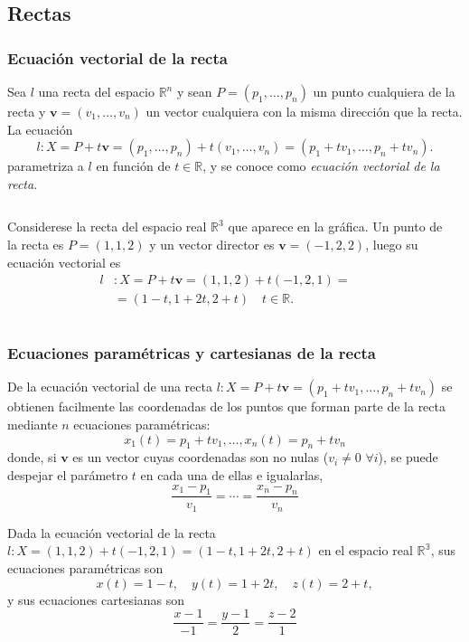 \subsection{Rectas}
\begin{frame}
\frametitle{Ecuación vectorial de la recta}
\begin{definicion}
Sea $l$ una recta del espacio $\mathbb{R}^n$ y sean $P=(p_1,\ldots,p_n)$ un punto cualquiera de la recta y
$\mathbf{v}=(v_1,\ldots,v_n)$ un vector cualquiera con la misma dirección que la recta.
La ecuación
\[
l: X= P + t\mathbf{v} = (p_1,\ldots,p_n)+t(v_1,\ldots,v_n) = (p_1+tv_1,\ldots,p_n+tv_n).
\]
parametriza a $l$ en función de $t\in \mathbb{R}$, y se conoce como \emph{ecuación vectorial de la recta}.
\end{definicion}
\begin{columns}
\begin{column}{.48\textwidth}
Considerese la recta del espacio real $\mathbb{R}^3$ que aparece en la gráfica. Un punto de la recta es $P=(1,1,2)$ y un vector director es $\mathbf{v}=(-1,2,2)$, luego su ecuación vectorial es
\begin{align*}
l &: X= P + t\mathbf{v} = (1,1,2)+t(-1,2,1) =\\
&= (1-t,1+2t,2+t)\quad t\in\mathbb{R}.
\end{align*}
\end{column}
\begin{column}{.48\textwidth}
\begin{center}
\scalebox{0.8}{}
\end{center}
\end{column}
\end{columns}
\end{frame} 


\begin{frame}
\frametitle{Ecuaciones paramétricas y cartesianas de la recta}
De la ecuación vectorial de una recta $l: X=P + t\mathbf{v}=(p_1+tv_1,\ldots,p_n+tv_n)$ se obtienen facilmente las coordenadas de los puntos que forman parte de la recta mediante $n$ ecuaciones paramétricas:
\[
x_1(t)=p_1+tv_1, \ldots, x_n(t)=p_n+tv_n
\]
donde, si $\mathbf{v}$ es un vector cuyas coordenadas son no nulas ($v_i\neq 0$ $\forall i$), se puede despejar el parámetro $t$ en cada una de ellas e igualarlas,
\[
\frac{x_1-p_1}{v_1}=\cdots = \frac{x_n-p_n}{v_n}
\] 

Dada la ecuación vectorial de la recta $l: X=(1,1,2)+t(-1,2,1) =(1-t,1+2t,2+t)$ en el espacio real $\mathbb{R^3}$, sus
ecuaciones paramétricas son
\[
x(t) = 1-t, \quad y(t)=1+2t, \quad z(t)=2+t,
\]
y sus ecuaciones cartesianas son
\[
\frac{x-1}{-1}=\frac{y-1}{2}=\frac{z-2}{1}
\]
\end{frame} 


